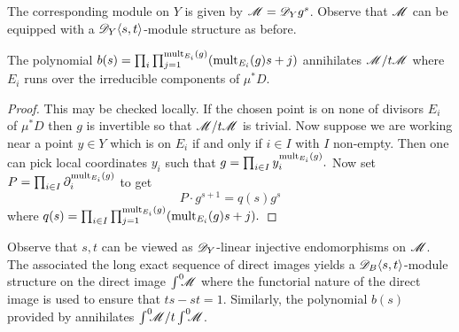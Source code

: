 The corresponding module on $Y$ is given by $\mathscr{M} = \mathscr{D}_{Y} g^s$.
Observe that $\mathscr{M}$ can be equipped with a $\mathscr{D}_Y\langle s,t\rangle$-module structure as before.
\begin{lemma}\label{lem: UpstairsB}
  The polynomial $b(s) = \prod_{i} \prod_{j=1}^{\operatorname{mult}_{E_i}(g)} (\operatorname{mult}_{E_i}(g)s + j)$ annihilates $\mathscr{M} / t\mathscr{M}$ where $E_i$ runs over the irreducible components of $\mu^*D$.
\end{lemma}
\begin{proof}
  This may be checked locally.
  If the chosen point is on none of divisors $E_i$ of $\mu^*D$ then $g$ is invertible so that $\mathscr{M}/t\mathscr{M}$ is trivial.
  Now suppose we are working near a point $y\in Y$ which is on $E_i$ if and only if $i\in I$ with $I$ non-empty.
  Then one can pick local coordinates $y_i$ such that
  $ g = \prod_{i\in I} y_i^{\operatorname{mult}_{E_i}(g)}.$
  Now set $P = \prod_{i\in I}\partial_i^{\operatorname{mult}_{E_i}(g)}$ to get
  $$P\cdot g^{s+1} = q(s) g^s $$
  where $q(s) = \prod_{i\in I}\prod_{j=1}^{\operatorname{mult}_{E_i}(g)} (\operatorname{mult}_{E_i}(g)s + j ). $
\end{proof}
Observe that $s,t$ can be viewed as $\mathscr{D}_Y$-linear injective endomorphisms on $\mathscr{M}$.
The associated the long exact sequence of direct images yields a $\mathscr{D}_B\langle s,t\rangle$-module structure on the direct image $\int^0 \mkern -8mu \mathscr{M}$ where the functorial nature of the direct image is used to ensure that $ts -st = 1$.
Similarly, the polynomial $ b(s)$ provided by  annihilates $\int^0 \mkern -8mu\mathscr{M}/t\int^0 \mkern -8mu\mathscr{M}$.

